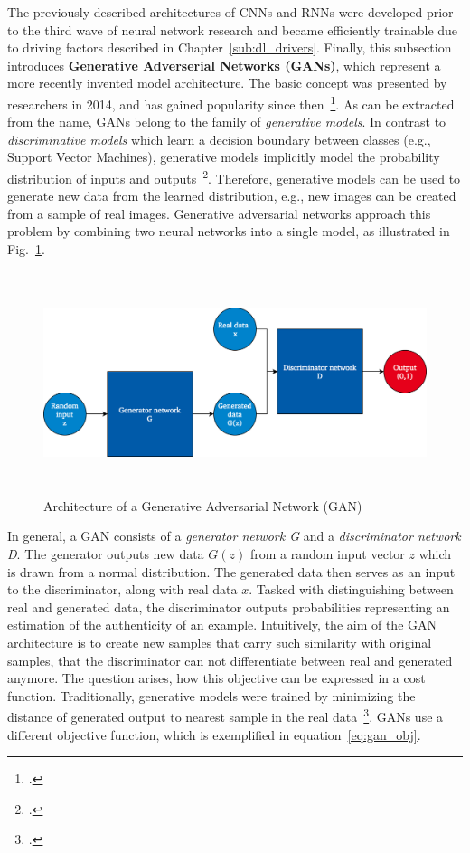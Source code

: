 The previously described architectures of CNNs and RNNs were developed prior to
the third wave of neural network research and became efficiently trainable
due to driving factors described in Chapter~\ref{sub:dl_drivers}.
Finally, this subsection introduces \textbf{Generative Adverserial Networks (GANs)}, which
represent a more recently invented model architecture.
The basic concept was presented by researchers in 2014, and has gained popularity
since then~\footcite{Goodfellow2014}.
As can be extracted from the name, GANs belong to the family of \textit{generative
models}.
In contrast to \textit{discriminative models} which learn a decision boundary
between classes (e.g., Support Vector Machines), generative models implicitly 
model the probability distribution of inputs and outputs~\footcite{Bishop2006}.
Therefore, generative models can be used to generate new data from the learned
distribution, e.g., new images can be created from a sample of real images.
Generative adversarial networks approach this problem by combining two neural 
networks into a single model, as illustrated in Fig.~\ref{fig:gan_architecture}.

\begin{figure}[h]
  \includegraphics[height=6.5cm]{img/gan_architecture}
  \caption{Architecture of a Generative Adversarial Network (GAN)}
\label{fig:gan_architecture}
\end{figure}

In general, a GAN consists of a \textit{generator network G} and a \textit{discriminator network D}.
The generator outputs new data $G(z)$ from a random input vector $z$ which is
drawn from a normal distribution.
The generated data then serves as an input to the discriminator, along with
real data $x$.
Tasked with distinguishing between real and generated data, the discriminator
outputs probabilities representing an estimation of the authenticity of an
example.
Intuitively, the aim of the GAN architecture is to create new samples that carry
such similarity with original samples, that the discriminator can not differentiate
between real and generated anymore.
The question arises, how this objective can be expressed in a cost function.
Traditionally, generative models were trained by minimizing the distance of
generated output to nearest sample in the real data~\footcite{Goodfellow2014}.
GANs use a different objective function, which is exemplified in equation~\ref{eq:gan_obj}.

